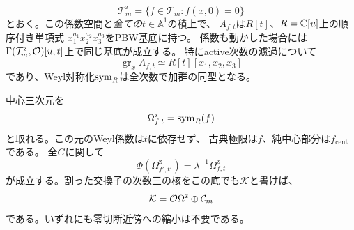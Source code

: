 \begin{theorem}[零制限における全パラメータの同変中心元]
\label{thm:pg-equivariant-zero-center}
\begin{equation}
 \mathcal T_m^{\mathrm z}
 =\{f\in\mathcal T_m:f(x,0)=0\}
 \label{eq:pg-equivariant-zero-base}
\end{equation}
とおく。この係数空間と\emph{全ての}$t\in\mathbb A^1$の積上で、
$A_{f,t}$は$R[t]$、$R=\mathbb C[u]$上の順序付き単項式
$x_1^{a_1}x_2^{a_2}x_3^{a_3}$をPBW基底に持つ。
係数も動かした場合には$\Gamma(\mathcal T_m^{\mathrm z},\mathcal O)[u,t]$上で同じ基底が成立する。
特にactive次数の濾過について
\begin{equation}
 \operatorname{gr}_x A_{f,t}\simeq R[t][x_1,x_2,x_3]
 \label{eq:pg-equivariant-zero-pbw}
\end{equation}
であり、Weyl対称化$\operatorname{sym}_R$は全次数で加群の同型となる。

中心三次元を
\begin{equation}
 \Omega^{\mathrm z}_{f,t}=\operatorname{sym}_R(f)
 \label{eq:pg-equivariant-zero-center}
\end{equation}
と取れる。この元のWeyl係数は$t$に依存せず、
古典極限は$f$、純中心部分は$f_{\mathrm{cent}}$である。
全$G$に関して
\begin{equation}
 \Phi(\Omega^{\mathrm z}_{f',t'})=\lambda^{-1}\Omega^{\mathrm z}_{f,t}
 \label{eq:pg-equivariant-zero-covariance}
\end{equation}
が成立する。割った交換子の次数三の核をこの底でも$\mathcal K$と書けば、
\begin{equation}
 \mathcal K=\mathcal O\Omega^{\mathrm z}\oplus\mathcal C_m
 \label{eq:pg-equivariant-zero-kernel}
\end{equation}
である。いずれにも零切断近傍への縮小は不要である。
\end{theorem}
